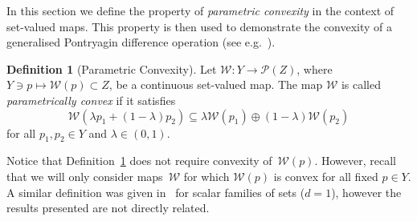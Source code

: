 \documentclass{elsarticle}
\newcounter{thmcount}
\theoremstyle{remark}
\theoremstyle{definition}
\newtheorem{defi}[thmcount]{Definition}
\begin{document}
In this section we define the property of \emph{parametric convexity} in the context of set-valued maps. 
%
This property is then used to demonstrate the convexity of a generalised Pontryagin difference operation (see e.g.~\cite{Hadwiger:1950,blanchini:2007}). 
%
%
\begin{defi}[Parametric Convexity]\label{def:parametric:convexity}
Let $\mathcal W:Y\rightarrow \mathscr P(Z)$, where $Y\ni p\mapsto \mathcal W(p) \subset Z$, be a continuous set-valued map. The map $\mathcal W$ is called \emph{parametrically convex} if it satisfies
%
  \begin{equation}\label{eq:def:parametrically:convex}
  \mathcal W(\lambda p_1 + (1-\lambda)p_2)\subseteq\lambda \mathcal W(p_1) \oplus (1-\lambda) \mathcal W(p_2)
  \end{equation}
%
  for all $p_1,p_2\in Y$ and $\lambda\in (0,1)$.
\end{defi}
%
Notice that Definition~\ref{def:parametric:convexity} does not require convexity of~$\mathcal W(p)$. 
%
However, recall that we will only consider maps~$\mathcal W$ for which $\mathcal W(p)$ is convex for all fixed $p\in Y$.
%
A similar definition was given in~\cite{Hadwiger:1957} for scalar families of sets ($d=1$), however the results presented are not directly related.
\end{document}
